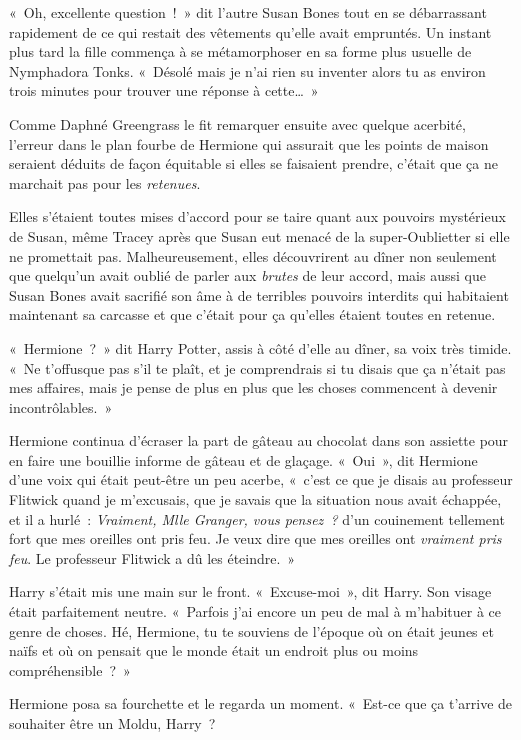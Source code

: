 «~Oh, excellente question~!~» dit l'autre Susan Bones tout en se débarrassant rapidement de ce qui restait des vêtements qu'elle avait empruntés. Un instant plus tard la fille commença à se métamorphoser en sa forme plus usuelle de Nymphadora Tonks. «~Désolé mais je n'ai rien su inventer alors tu as environ trois minutes pour trouver une réponse à cette…~»

\later

Comme Daphné Greengrass le fit remarquer ensuite avec quelque acerbité, l'erreur dans le plan fourbe de Hermione qui assurait que les points de maison seraient déduits de façon équitable si elles se faisaient prendre, c'était que ça ne marchait pas pour les \emph{retenues}.

Elles s'étaient toutes mises d'accord pour se taire quant aux pouvoirs mystérieux de Susan, même Tracey après que Susan eut menacé de la super-Oublietter si elle ne promettait pas. Malheureusement, elles découvrirent au dîner non seulement que quelqu'un avait oublié de parler aux \emph{brutes} de leur accord, mais aussi que Susan Bones avait sacrifié son âme à de terribles pouvoirs interdits qui habitaient maintenant sa carcasse et que c'était pour ça qu'elles étaient toutes en retenue.

«~Hermione~?~» dit Harry Potter, assis à côté d'elle au dîner, sa voix très timide. «~Ne t'offusque pas s'il te plaît, et je comprendrais si tu disais que ça n'était pas mes affaires, mais je pense de plus en plus que les choses commencent à devenir incontrôlables.~»

Hermione continua d'écraser la part de gâteau au chocolat dans son assiette pour en faire une bouillie informe de gâteau et de glaçage. «~Oui~», dit Hermione d'une voix qui était peut-être un peu acerbe, «~c'est ce que je disais au professeur Flitwick quand je m'excusais, que je savais que la situation nous avait échappée, et il a hurlé~: \emph{Vraiment, Mlle Granger, vous pensez~?} d'un couinement tellement fort que mes oreilles ont pris feu. Je veux dire que mes oreilles ont \emph{vraiment pris feu}. Le professeur Flitwick a dû les éteindre.~»

Harry s'était mis une main sur le front. «~Excuse-moi~», dit Harry. Son visage était parfaitement neutre. «~Parfois j'ai encore un peu de mal à m'habituer à ce genre de choses. Hé, Hermione, tu te souviens de l'époque où on était jeunes et naïfs et où on pensait que le monde était un endroit plus ou moins compréhensible~?~»

Hermione posa sa fourchette et le regarda un moment. «~Est-ce que ça t'arrive de souhaiter être un Moldu, Harry~?

